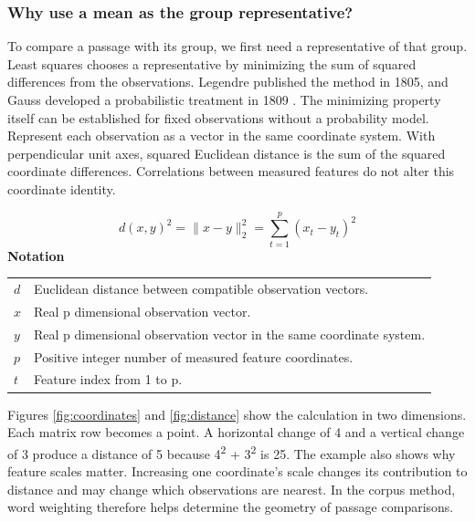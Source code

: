 \documentclass[10pt,letterpaper]{article}
\newcommand{\notlabel}{\noindent\textbf{Notation}\par\nobreak\vspace{4pt}}
\begin{document}
\subsubsection{Why use a mean as the group representative?}
To compare a passage with its group, we first need a representative of that group. Least squares chooses a representative by minimizing the sum of squared differences from the observations. Legendre published the method in 1805, and Gauss developed a probabilistic treatment in 1809 \cite{legendre,gauss}. The minimizing property itself can be established for fixed observations without a probability model. Represent each observation as a vector in the same coordinate system. With perpendicular unit axes, squared Euclidean distance is the sum of the squared coordinate differences. Correlations between measured features do not alter this coordinate identity.\par

\par\noindent\begin{minipage}{\linewidth}
\begin{equation}\label{eq:distance}
d(x,y)^2=\lVert x-y\rVert_2^2=\sum_{t=1}^{p}(x_t-y_t)^2
\end{equation}
\notlabel
{\fontsize{8.5}{10.5}\selectfont\setlength{\tabcolsep}{0pt}\renewcommand{\arraystretch}{1.12}
\begin{tabularx}{\linewidth}{@{}p{.14\linewidth}X@{}}
$d$ & Euclidean distance between compatible observation vectors.\\
$x$ & Real p dimensional observation vector.\\
$y$ & Real p dimensional observation vector in the same coordinate system.\\
$p$ & Positive integer number of measured feature coordinates.\\
$t$ & Feature index from 1 to p.\\
\end{tabularx}}
\par\vspace{2pt}
\end{minipage}\par
Figures \ref{fig:coordinates} and \ref{fig:distance} show the calculation in two dimensions. Each matrix row becomes a point. A horizontal change of 4 and a vertical change of 3 produce a distance of 5 because 4\textsuperscript{2} + 3\textsuperscript{2} is 25. The example also shows why feature scales matter. Increasing one coordinate's scale changes its contribution to distance and may change which observations are nearest. In the corpus method, word weighting therefore helps determine the geometry of passage comparisons.\par
\end{document}
